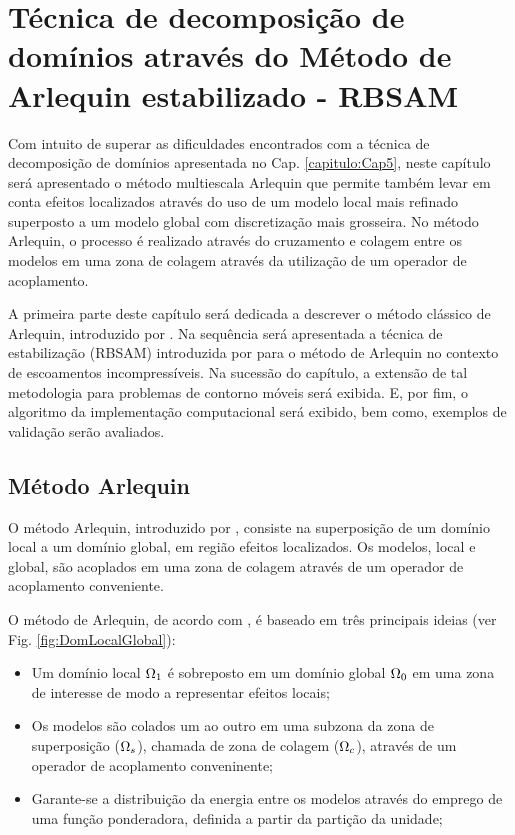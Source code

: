 \documentclass[tese_patricia]{subfiles}
\begin{document}
\chapter[Método de Arlequin estabilizado]{Técnica de decomposição de domínios através do Método de Arlequin estabilizado - RBSAM} \label{capitulo:Cap6}

Com intuito de superar as dificuldades encontrados com a técnica de decomposição de domínios apresentada no Cap. \ref{capitulo:Cap5}, neste capítulo será apresentado o método multiescala Arlequin que permite também levar em conta efeitos localizados através do uso de um modelo local mais refinado superposto a um modelo global com discretização mais grosseira. No método Arlequin, o processo é realizado através do cruzamento e colagem entre os modelos em uma zona de colagem através da utilização de um operador de acoplamento.

A primeira parte deste capítulo será dedicada a descrever o método clássico de Arlequin, introduzido por . Na sequência será apresentada  a técnica de estabilização (RBSAM) introduzida por  para o método de Arlequin no contexto de escoamentos incompressíveis. Na sucessão do capítulo, a extensão de tal metodologia para problemas de contorno móveis será exibida. E, por fim, o algoritmo da implementação computacional será exibido, bem como, exemplos de validação serão avaliados.

\section{Método Arlequin}

O método Arlequin, introduzido por , consiste na superposição de um domínio local a um domínio global, em região efeitos localizados. Os modelos, local e global, são acoplados em uma zona de colagem através de um operador de acoplamento conveniente.

O  método de Arlequin, de acordo com , é baseado em três principais ideias (ver Fig. \ref{fig:DomLocalGlobal}):

\begin{itemize}
	\item Um domínio local $\Omega_1$ é sobreposto em um domínio global  $\Omega_0$ em uma zona de interesse de modo a representar efeitos locais;
	\item Os modelos são colados um ao outro em uma subzona da zona de superposição ($\Omega_s$), chamada de zona de colagem ($\Omega_c$), através de um operador de acoplamento conveninente;
	\item  Garante-se a distribuição da energia entre os modelos através do emprego de uma função ponderadora, definida a partir da partição da unidade;
\end{itemize}
\end{document}
